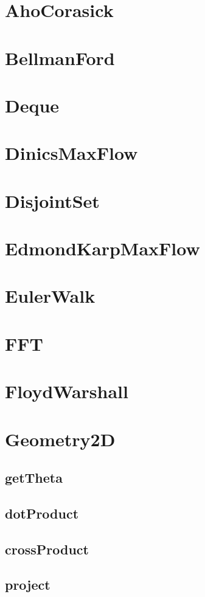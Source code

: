 \documentclass[a4paper]{article}
\begin{document}
\tableofcontents

\section{AhoCorasick}
\section{BellmanFord}
\section{Deque}
\section{DinicsMaxFlow}
\section{DisjointSet}
\section{EdmondKarpMaxFlow}
\section{EulerWalk}
\section{FFT}
\section{FloydWarshall}
\section{Geometry2D}
\subsection{getTheta}
\subsection{dotProduct}
\subsection{crossProduct}
\subsection{project}
\end{document}

